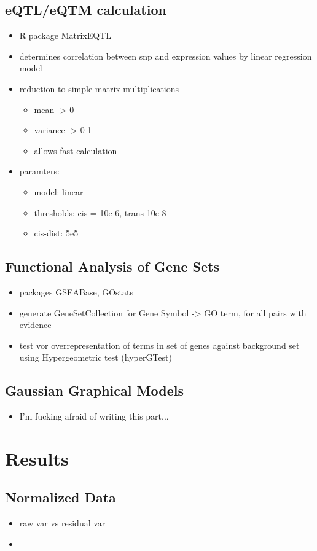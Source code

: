 \documentclass[a4paper,12pt]{article}
\begin{document}
\subsection{eQTL/eQTM calculation}
\begin{itemize}
\item R package MatrixEQTL
\item determines correlation between snp and expression values by linear regression model
\item reduction to simple matrix multiplications
\begin{itemize}
\item mean -> 0
\item variance -> 0-1
\item allows fast calculation
\end{itemize}
\item paramters: 
\begin{itemize}
\item model: linear
\item thresholds: cis = 10e-6, trans 10e-8
\item cis-dist: 5e5
\end{itemize}
\end{itemize}
\subsection{Functional Analysis of Gene Sets}
\begin{itemize}
\item packages GSEABase, GOstats
\item generate GeneSetCollection for Gene Symbol -> GO term, for all pairs with evidence
\item test vor overrepresentation of terms in set of genes against background set using Hypergeometric test (hyperGTest)
\end{itemize}
\subsection{Gaussian Graphical Models}
\begin{itemize}
\item I'm fucking afraid of writing this part...
\end{itemize}

\newpage
\section{Results}
\subsection{Normalized Data}
\begin{itemize}
\item raw var vs residual var
\item 
\end{itemize}
\end{document}
